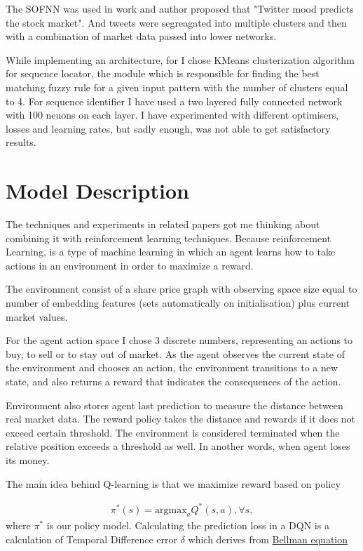 \documentclass{article}
\begin{document}
The SOFNN was used in work \cite{BOLLEN20111} and author proposed that "Twitter mood predicts the stock market". And tweets were segreagated into multiple clusters and then with a combination of market data passed into lower networks.

While implementing an architecture, for I chose KMeans clusterization algorithm \cite{Hartigan1979} for sequence locator, the module which is responsible for finding the best matching fuzzy rule for a given input pattern with the number of clusters equal to 4. 
For sequence identifier I have used a two layered fully connected network with 100 neuons on each layer.
I have experimented with different optimisers, losses and learning rates, but sadly enough, was not able to get satisfactory results.


\section{Model Description}
The techniques and experiments in related papers got me thinking about combining it with reinforcement learning techniques.
Because reinforcement Learning, is a type of machine learning in which an agent learns how to take actions in an environment in order to maximize a reward.

The environment consist of a share price graph with observing space size equal to number of embedding features (sets automatically on initialisation) plus current market values.

For the agent action space I chose 3 discrete numbers, representing an actions to buy, to sell or to stay out of market.
As the agent observes the current state of the environment and chooses an action, the environment transitions to a new state, and also returns a reward that indicates the consequences of the action. 

Environment also stores agent last prediction to measure the distance between real market data.
The reward policy takes the distance and rewards if it does not exceed certain threshold.
The environment is considered terminated when the relative position exceeds a threshold as well. In another words, when agent loses its money.

The main idea behind Q-learning is that we maximize reward based on policy 

\begin{align}
\pi^*(s)  = \text{argmax}_a Q^*(s,a), \forall s,
\end{align}
where $\pi^*$ is our policy model. 
Calculating the prediction loss in a DQN is a calculation of Temporal Difference error $\delta$ which derives from \href{https://towardsdatascience.com/how-does-a-dqn-approximate-bellmans-equation-53e591d5e33}{Bellman equation}
\end{document}
